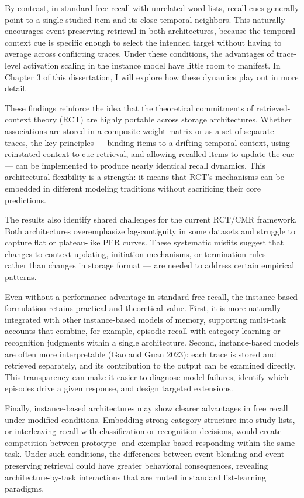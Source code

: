\documentclass[
  letterpaper,
  11pt,
  english,
  singlespacing,
  headsepline]{MastersDoctoralThesis}
\begin{document}
By contrast, in standard free recall with unrelated word lists, recall
cues generally point to a single studied item and its close temporal
neighbors. This naturally encourages event-preserving retrieval in both
architectures, because the temporal context cue is specific enough to
select the intended target without having to average across conflicting
traces. Under these conditions, the advantages of trace-level activation
scaling in the instance model have little room to manifest. In Chapter 3
of this dissertation, I will explore how these dynamics play out in more
detail.

These findings reinforce the idea that the theoretical commitments of
retrieved-context theory (RCT) are highly portable across storage
architectures. Whether associations are stored in a composite weight
matrix or as a set of separate traces, the key principles --- binding
items to a drifting temporal context, using reinstated context to cue
retrieval, and allowing recalled items to update the cue --- can be
implemented to produce nearly identical recall dynamics. This
architectural flexibility is a strength: it means that RCT's mechanisms
can be embedded in different modeling traditions without sacrificing
their core predictions.

The results also identify shared challenges for the current RCT/CMR
framework. Both architectures overemphasize lag-contiguity in some
datasets and struggle to capture flat or plateau-like PFR curves. These
systematic misfits suggest that changes to context updating, initiation
mechanisms, or termination rules --- rather than changes in storage
format --- are needed to address certain empirical patterns.

Even without a performance advantage in standard free recall, the
instance-based formulation retains practical and theoretical value.
First, it is more naturally integrated with other instance-based models
of memory, supporting multi-task accounts that combine, for example,
episodic recall with category learning or recognition judgments within a
single architecture. Second, instance-based models are often more
interpretable (Gao and Guan 2023): each trace is stored and retrieved
separately, and its contribution to the output can be examined directly.
This transparency can make it easier to diagnose model failures,
identify which episodes drive a given response, and design targeted
extensions.

Finally, instance-based architectures may show clearer advantages in
free recall under modified conditions. Embedding strong category
structure into study lists, or interleaving recall with classification
or recognition decisions, would create competition between prototype-
and exemplar-based responding within the same task. Under such
conditions, the differences between event-blending and event-preserving
retrieval could have greater behavioral consequences, revealing
architecture-by-task interactions that are muted in standard
list-learning paradigms.
\end{document}
